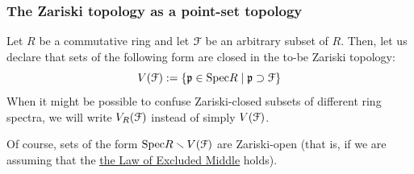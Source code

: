         \subsubsection{The Zariski topology as a point-set topology} 
            \begin{definition} \label{def: zariski_closed}
                Let $R$ be a commutative ring and let $\mathcal{F}$ be an arbitrary subset of $R$. Then, let us declare that sets of the following form are closed in the to-be Zariski topology:
                    $$V(\mathcal{F}) := \left\{\mathfrak{p} \in \mathrm{Spec} R \mid \mathfrak{p} \supset \mathcal{F} \right\}$$
                When it might be possible to confuse Zariski-closed subsets of different ring spectra, we will write $V_R(\mathcal{F})$ instead of simply $V(\mathcal{F})$.
            \end{definition}
            \begin{remark}
                Of course, sets of the form $\mathrm{Spec} R \smallsetminus V(\mathcal{F})$ are Zariski-open (that is, if we are assuming that the \href{https://ncatlab.org/nlab/show/excluded+middle}{\underline{the Law of Excluded Middle}} holds).
            \end{remark}
            
